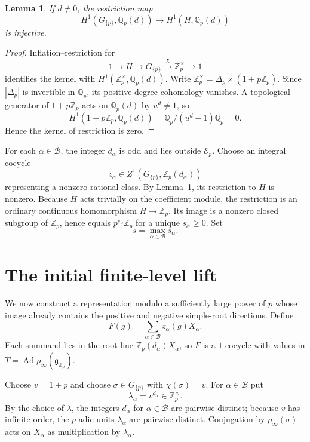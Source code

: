 \documentclass[11pt]{amsart}
\numberwithin{equation}{section}
\newcommand{\Qp}{\mathbb Q_p}
\newcommand{\Zp}{\mathbb Z_p}
\newcommand{\Ad}{\operatorname{Ad}}
\newcommand{\cE}{\mathcal E}
\newcommand{\frakg}{\mathfrak g}
\newtheorem{lemma}[theorem]{Lemma}
\theoremstyle{definition}
\begin{document}
\begin{lemma}\label{lem:restriction}
If $d\neq0$, the restriction map
\[
 H^1(G_{\{p\}},\Qp(d))
 \longrightarrow H^1(H,\Qp(d))
\]
is injective.
\end{lemma}

\begin{proof}
Inflation--restriction for
\[
 1\longrightarrow H\longrightarrow G_{\{p\}}
 \xrightarrow{\chi}\Zp^\times\longrightarrow1
\]
identifies the kernel with $H^1(\Zp^\times,\Qp(d))$.  Write
$\Zp^\times=\Delta_p\times(1+p\Zp)$.  Since $|\Delta_p|$ is invertible
in $\Qp$, its positive-degree cohomology vanishes.  A topological
generator of $1+p\Zp$ acts on $\Qp(d)$ by $u^d\neq1$, so
\[
 H^1(1+p\Zp,\Qp(d))
 =\Qp/(u^d-1)\Qp=0.
\]
Hence the kernel of restriction is zero.
\end{proof}

For each $\alpha\in\mathcal B$, the integer $d_\alpha$ is odd and
lies outside $\cE_p$.  Choose an integral cocycle
\begin{equation}\label{eq:z-alpha-cocycles}
        z_\alpha\in
        Z^1(G_{\{p\}},\Zp(d_\alpha))
\end{equation}
representing a nonzero rational class.  By
Lemma~\ref{lem:restriction}, its restriction to $H$ is nonzero.
Because $H$ acts trivially on the coefficient module, the
restriction is an ordinary continuous homomorphism $H\longrightarrow\Zp$. Its image is a nonzero closed subgroup of $\Zp$, hence equals
$p^{s_\alpha}\Zp$ for a unique $s_\alpha\ge0$.  Set
\begin{equation}\label{eq:s-choice}
        s=\max_{\alpha\in\mathcal B}s_\alpha.
\end{equation}

\section{The initial finite-level lift}\label{sec:initial}

We now construct a representation modulo a sufficiently large power of
$p$ whose image already contains the positive and negative simple-root
directions. Define
\begin{equation}\label{eq:F-cocycle}
        F(g)=\sum_{\alpha\in\mathcal B}z_\alpha(g)X_\alpha.
\end{equation}
Each summand lies in the root line
$\Zp(d_\alpha)X_\alpha$, so $F$ is a $1$-cocycle with values in
$T=\Ad\rho_\infty(\frakg_{\Zp})$.

Choose $v=1+p$ and choose $\sigma\in G_{\{p\}}$ with
$\chi(\sigma)=v$. For $\alpha\in\mathcal B$ put
\[
        \lambda_\alpha=v^{d_\alpha}\in\Zp^\times.
\]
By the choice of $\lambda$, the integers $d_\alpha$ for
$\alpha\in\mathcal B$ are pairwise distinct; because $v$ has infinite
order, the $p$-adic units $\lambda_\alpha$ are pairwise distinct.
Conjugation by $\rho_\infty(\sigma)$ acts on $X_\alpha$ as
multiplication by $\lambda_\alpha$.
\end{document}
